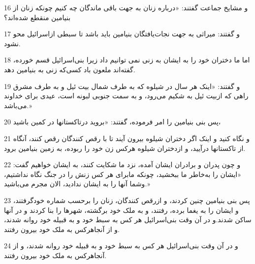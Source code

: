 \par 16 و مشایخ جماعت گفتند: «درباره زنان به جهت باقی ماندگان چه کنیم چونکه زنان از بنیامین منقطع شده‌اند؟
\par 17 و گفتند: میراثی به جهت نجات‌یافتگان بنیامین باید باشد تا سبطی ازاسرائیل محو نشود.
\par 18 اما ما دختران خود را به ایشان به زنی نمی توانیم داد زیرا بنی‌اسرائیل قسم خورده، گفته‌اند ملعون باد کسی‌که زنی به بنیامین دهد.
\par 19 و گفتند: «اینک هر سال در شیلوه که به طرف شمال بیت ئیل و به طرف مشرق راهی که ازبیت ئیل به شکیم می‌رود، و به سمت جنوبی لبونه است، عیدی برای خداوند می‌باشد.»
\par 20 پس بنی بنیامین را امر فرموده، گفتند: «بروید درتاکستانها در کمین باشید،
\par 21 و نگاه کنید و اینک اگر دختران شیلوه بیرون آیند تا با رقص کنندگان رقص کنند، آنگاه از تاکستانها درآیید، و ازدختران شیلوه هرکس زن خود را ربوده، به زمین بنیامین برود.
\par 22 و چون پدران و برادران ایشان آمده، نزد ما شکایت کنند، به ایشان خواهیم گفت: «ایشان را به‌خاطر ما ببخشید، چونکه مابرای هر کس زنش را در جنگ نگاه نداشتیم، وشما آنها را به ایشان ندادید، الان مجرم می‌باشید.»
\par 23 پس بنی بنیامین چنین کردند، و ازرقص کنندگان، زنان را برحسب شماره خودگرفتند، و ایشان را به یغما برده، رفتند، و به ملک خود برگشته، شهرها را بنا کردند و در آنها ساکن شدند.و در آن وقت بنی‌اسرائیل هر کس به سبط خود و به قبیله خود روانه شدند، و از آنجاهرکس به ملک خود بیرون رفتند.
\par 24 و در آن وقت بنی‌اسرائیل هر کس به سبط خود و به قبیله خود روانه شدند، و از آنجاهرکس به ملک خود بیرون رفتند.


